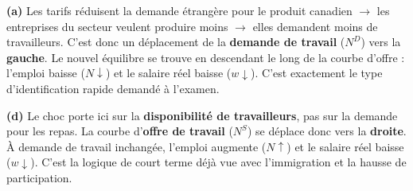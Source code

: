 
\begin{reponse}
\textbf{(a)} Les tarifs réduisent la demande étrangère pour le produit canadien $\to$ les entreprises du secteur veulent produire moins $\to$ elles demandent moins de travailleurs. C'est donc un déplacement de la \textbf{demande de travail} ($N^D$) vers la \textbf{gauche}. Le nouvel équilibre se trouve en descendant le long de la courbe d'offre : l'emploi baisse ($N \downarrow$) et le salaire réel baisse ($w \downarrow$). C'est exactement le type d'identification rapide demandé à l'examen.
\end{reponse}


\begin{reponse}
\textbf{(d)} Le choc porte ici sur la \textbf{disponibilité de travailleurs}, pas sur la demande pour les repas. La courbe d'\textbf{offre de travail} ($N^S$) se déplace donc vers la \textbf{droite}. À demande de travail inchangée, l'emploi augmente ($N \uparrow$) et le salaire réel baisse ($w \downarrow$). C'est la logique de court terme déjà vue avec l'immigration et la hausse de participation.
\end{reponse}


